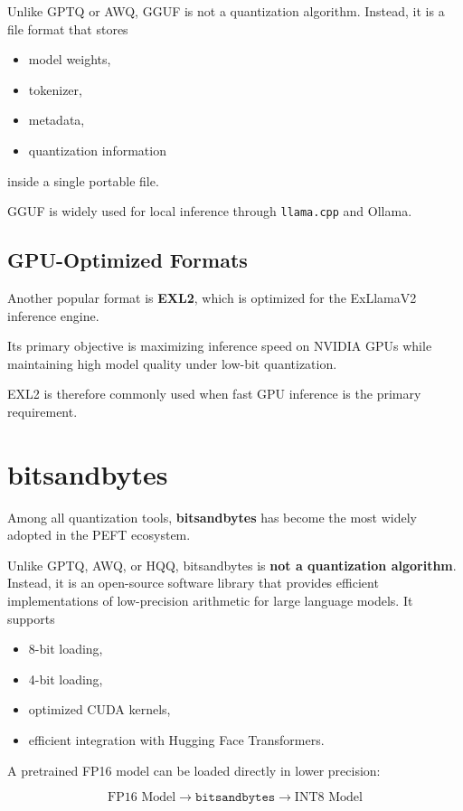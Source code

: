 Unlike GPTQ or AWQ, GGUF is not a quantization algorithm. Instead, it is a file format that stores

\begin{itemize}
\item model weights,
\item tokenizer,
\item metadata,
\item quantization information
\end{itemize}

inside a single portable file.

GGUF is widely used for local inference through \texttt{llama.cpp} and Ollama.
\subsection*{GPU-Optimized Formats}

Another popular format is \textbf{EXL2}, which is optimized for the ExLlamaV2 inference engine.

Its primary objective is maximizing inference speed on NVIDIA GPUs while maintaining high model quality under low-bit quantization.

EXL2 is therefore commonly used when fast GPU inference is the primary requirement.
\section{bitsandbytes}

Among all quantization tools, \textbf{bitsandbytes} has become the most widely adopted in the PEFT ecosystem.

Unlike GPTQ, AWQ, or HQQ, bitsandbytes is \textbf{not a quantization algorithm}. Instead, it is an open-source software library that provides efficient implementations of low-precision arithmetic for large language models.
It supports

\begin{itemize}
\item 8-bit loading,
\item 4-bit loading,
\item optimized CUDA kernels,
\item efficient integration with Hugging Face Transformers.
\end{itemize}
A pretrained FP16 model can be loaded directly in lower precision:

\[
\text{FP16 Model}
\longrightarrow
\texttt{bitsandbytes}
\longrightarrow
\text{INT8 Model}
\]

